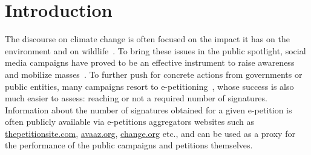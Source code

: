 \section{Introduction}
\label{sec:intro}

%
%

The discourse on climate change is often focused on the impact it has on the environment and on  wildlife~\cite{solomon2009irreversible}.
To bring these issues in the public spotlight, social media campaigns have proved to be an effective instrument to raise awareness and mobilize masses~\cite{Pearce2014}.
To further push for concrete actions from governments or public entities, many campaigns resort to e-petitioning~\cite{mosca2009petitioning}, whose success is also much easier to assess: reaching or not a required number of signatures.
Information about the number of signatures obtained for a given e-petition is often publicly available via e-petitions aggregators websites such as \url{thepetitionsite.com}, \url{avaaz.org}, \url{change.org} etc., and can be used as a proxy for the performance of the public campaigns and petitions themselves.

%

